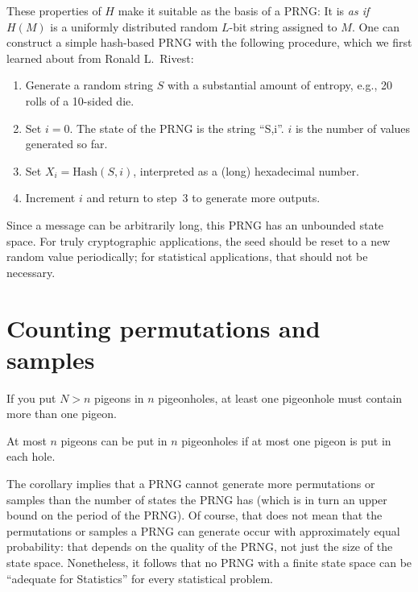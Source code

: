 \documentclass[graybox]{svmult}
\begin{document}
These properties of $H$ make it suitable as the basis of a PRNG:
It is \emph{as if} $H(M)$ is a uniformly distributed random $L$-bit string assigned to $M$.
One can construct a simple hash-based PRNG with the following procedure, which we first learned about
from Ronald L.~Rivest:

\begin{enumerate}
\item Generate a random string $S$ with a substantial amount of entropy, e.g., 20 rolls of a
10-sided die.
\item Set $i=0$. The state of the PRNG is the string ``S,i''. $i$ is the number of values generated so far. 
\item Set $X_i = {\mbox{Hash}}(S,i)$, interpreted as a (long) hexadecimal number.
\item Increment $i$ and return to step~3 to generate more outputs.
\end{enumerate}

\noindent Since a message can be arbitrarily long, this PRNG has an unbounded state space. For truly cryptographic applications, the seed should be reset to a new random value periodically; for statistical applications, that should not be necessary.

\section{Counting permutations and samples}
\label{sec:count}

\begin{theorem}
If you put $N>n$ pigeons in $n$ pigeonholes, at least one
pigeonhole must contain more than one pigeon.
\end{theorem}

\begin{corollary}
At most $n$ pigeons can be put in $n$ pigeonholes if at most
one pigeon is put in each hole.
\end{corollary}

The corollary implies that a PRNG cannot generate more permutations or samples than the number of states the PRNG has (which is in turn an upper bound on the period of the PRNG).
Of course, that does not mean that the permutations or samples a PRNG can generate occur with approximately equal probability: that depends on the quality of the PRNG, not just the size of the state space. 
Nonetheless, it follows that no PRNG with a finite state space can be ``adequate for Statistics'' for every statistical problem.
\end{document}

